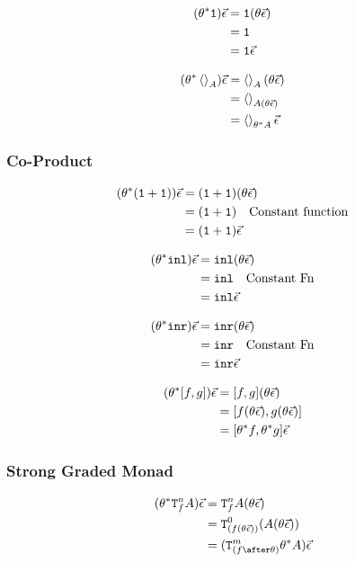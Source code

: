 \documentclass{report}
\begin{document}
\begin{align}
    (\theta^* \texttt{1})\vec{\epsilon} & = \texttt{1}(\theta\vec{\epsilon})\\
    & = \texttt{1} \\
    & = \texttt{1} \vec{\epsilon}\\
\end{align}

\begin{align}
    (\theta^*\left\langle\right\rangle_{A})\vec{\epsilon} & = \left\langle\right\rangle_{A}(\theta\vec{\epsilon})\\
    & = \left\langle\right\rangle_{A(\theta\vec{\epsilon})}\\
    & = \left\langle\right\rangle_{\theta^* A}\vec{\epsilon}
\end{align}


\subsubsection{Co-Product}

\begin{align}
    (\theta^*(\texttt{1} + \texttt{1}))\vec{\epsilon} & = (\texttt{1} + \texttt{1})(\theta\vec{\epsilon})\\
    & = (\texttt{1} + \texttt{1})\quad\text{Constant function}\\
    & = (\texttt{1} + \texttt{1})\vec{\epsilon}
\end{align}

\begin{align}
    (\theta^*\texttt{inl} )\vec{\epsilon} & = \texttt{inl}(\theta\vec{\epsilon})\\
    & = \texttt{inl} \quad\text{Constant Fn}\\
    & = \texttt{inl} \vec{\epsilon}
\end{align}

\begin{align}
    (\theta^*\texttt{inr} )\vec{\epsilon} & = \texttt{inr}(\theta\vec{\epsilon})\\
    & = \texttt{inr} \quad\text{Constant Fn}\\
    & = \texttt{inr} \vec{\epsilon}
\end{align}

\begin{align}
    (\theta^* [f, g])\vec{\epsilon} & = [f, g](\theta\vec{\epsilon})\\
    & = [f (\theta\vec{\epsilon}), g(\theta\vec{\epsilon})]\\
    & = [\theta^* f, \theta^* g]\vec{\epsilon}\\
\end{align}




\subsubsection{Strong Graded Monad}
\begin{align}
    (\theta\star\Tn{f}{A})\ev & = \Tn{f}{A}(\theta\ev) \\
    & = \Tz{(f(\theta\ev))}{(A(\theta\ev))}\\
    & = (\Tm{(f\after\theta)}{\theta\star A})\ev\\
\end{align}
\end{document}
